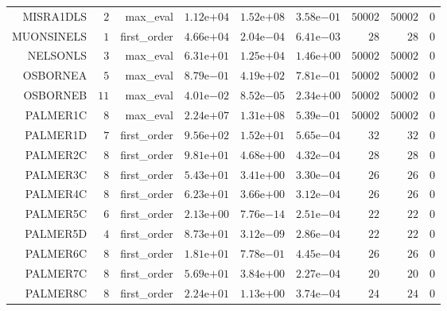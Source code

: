 \begin{longtable}{rrrrrrrrr}
MISRA1DLS & \(     2\) & max\_eval & \( 1.12\)e\(+04\) & \( 1.52\)e\(+08\) & \( 3.58\)e\(-01\) & \( 50002\) & \( 50002\) & \(     0\) \\
MUONSINELS & \(     1\) & first\_order & \( 4.66\)e\(+04\) & \( 2.04\)e\(-04\) & \( 6.41\)e\(-03\) & \(    28\) & \(    28\) & \(     0\) \\
NELSONLS & \(     3\) & max\_eval & \( 6.31\)e\(+01\) & \( 1.25\)e\(+04\) & \( 1.46\)e\(+00\) & \( 50002\) & \( 50002\) & \(     0\) \\
OSBORNEA & \(     5\) & max\_eval & \( 8.79\)e\(-01\) & \( 4.19\)e\(+02\) & \( 7.81\)e\(-01\) & \( 50002\) & \( 50002\) & \(     0\) \\
OSBORNEB & \(    11\) & max\_eval & \( 4.01\)e\(-02\) & \( 8.52\)e\(-05\) & \( 2.34\)e\(+00\) & \( 50002\) & \( 50002\) & \(     0\) \\
PALMER1C & \(     8\) & max\_eval & \( 2.24\)e\(+07\) & \( 1.31\)e\(+08\) & \( 5.39\)e\(-01\) & \( 50002\) & \( 50002\) & \(     0\) \\
PALMER1D & \(     7\) & first\_order & \( 9.56\)e\(+02\) & \( 1.52\)e\(+01\) & \( 5.65\)e\(-04\) & \(    32\) & \(    32\) & \(     0\) \\
PALMER2C & \(     8\) & first\_order & \( 9.81\)e\(+01\) & \( 4.68\)e\(+00\) & \( 4.32\)e\(-04\) & \(    28\) & \(    28\) & \(     0\) \\
PALMER3C & \(     8\) & first\_order & \( 5.43\)e\(+01\) & \( 3.41\)e\(+00\) & \( 3.30\)e\(-04\) & \(    26\) & \(    26\) & \(     0\) \\
PALMER4C & \(     8\) & first\_order & \( 6.23\)e\(+01\) & \( 3.66\)e\(+00\) & \( 3.12\)e\(-04\) & \(    26\) & \(    26\) & \(     0\) \\
PALMER5C & \(     6\) & first\_order & \( 2.13\)e\(+00\) & \( 7.76\)e\(-14\) & \( 2.51\)e\(-04\) & \(    22\) & \(    22\) & \(     0\) \\
PALMER5D & \(     4\) & first\_order & \( 8.73\)e\(+01\) & \( 3.12\)e\(-09\) & \( 2.86\)e\(-04\) & \(    22\) & \(    22\) & \(     0\) \\
PALMER6C & \(     8\) & first\_order & \( 1.81\)e\(+01\) & \( 7.78\)e\(-01\) & \( 4.45\)e\(-04\) & \(    26\) & \(    26\) & \(     0\) \\
PALMER7C & \(     8\) & first\_order & \( 5.69\)e\(+01\) & \( 3.84\)e\(+00\) & \( 2.27\)e\(-04\) & \(    20\) & \(    20\) & \(     0\) \\
PALMER8C & \(     8\) & first\_order & \( 2.24\)e\(+01\) & \( 1.13\)e\(+00\) & \( 3.74\)e\(-04\) & \(    24\) & \(    24\) & \(     0\) \\

\end{longtable}
